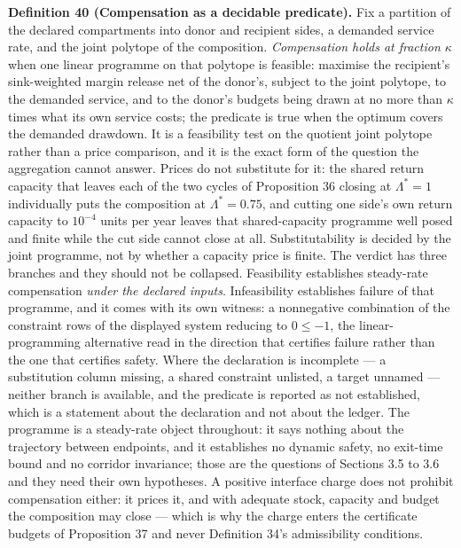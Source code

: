\documentclass[11pt]{article}
\begin{document}
\textbf{Definition 40 (Compensation as a decidable predicate).} Fix a partition of the declared compartments into donor and recipient sides, a demanded service rate, and the joint polytope of the composition. \emph{Compensation holds at fraction \(\kappa\)} when one linear programme on that polytope is feasible: maximise the recipient's sink-weighted margin release net of the donor's, subject to the joint polytope, to the demanded service, and to the donor's budgets being drawn at no more than \(\kappa\) times what its own service costs; the predicate is true when the optimum covers the demanded drawdown. It is a feasibility test on the quotient joint polytope rather than a price comparison, and it is the exact form of the question the aggregation cannot answer. Prices do not substitute for it: the shared return capacity that leaves each of the two cycles of Proposition 36 closing at \(\Lambda^{*} = 1\) individually puts the composition at \(\Lambda^{*} = 0.75\), and cutting one side's own return capacity to \(10^{-4}\) units per year leaves that shared-capacity programme well posed and finite while the cut side cannot close at all. Substitutability is decided by the joint programme, not by whether a capacity price is finite. The verdict has three branches and they should not be collapsed. Feasibility establishes steady-rate compensation \emph{under the declared inputs}. Infeasibility establishes failure of that programme, and it comes with its own witness: a nonnegative combination of the constraint rows of the displayed system reducing to \(0 \le -1\), the linear-programming alternative read in the direction that certifies failure rather than the one that certifies safety. Where the declaration is incomplete --- a substitution column missing, a shared constraint unlisted, a target unnamed --- neither branch is available, and the predicate is reported as not established, which is a statement about the declaration and not about the ledger. The programme is a steady-rate object throughout: it says nothing about the trajectory between endpoints, and it establishes no dynamic safety, no exit-time bound and no corridor invariance; those are the questions of Sections 3.5 to 3.6 and they need their own hypotheses. A positive interface charge does not prohibit compensation either: it prices it, and with adequate stock, capacity and budget the composition may close --- which is why the charge enters the certificate budgets of Proposition 37 and never Definition 34's admissibility conditions.
\end{document}
